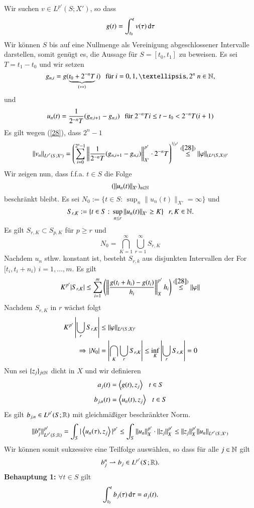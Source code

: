 \item %
Wir suchen $v\in L^{p'}(S;X')$, so dass
\[
    g(t)=\int_{t_0}^t v(\tau) \, \mathrm{d} \tau
\]
Wir können $S$ bis auf eine Nullmenge als Vereinigung abgeschlossener Intervalle darstellen, somit genügt
es, die Aussage für $S=[t_0,t_1]$ zu beweisen. Es sei $T=t_1-t_0$ und wir setzen
\[
    g_{n,i} = g(\underbrace{t_0+2^{-n}T}_{(**)}i) \qq\text{für $i=0,1,…,2^n$ $n\in\N$},
\]
und
\[
    u_n(t)=\frac1{2^{-n}T} (g_{n,i+1}-g_{n,i})\hspace{.25cm} \text{für $2^{-n}Ti\leq t-t_0<2^{-n}T(i+1)$}
\]
Es gilt wegen (\ref{28}), dass $2^n-1$
\begin{align}\label{29}
    \|v_n\|_{L^{p'}(S;X')} = \left( \sum_{i=0}^{2^n-1}\left\| \frac1{2^{-n}T}(g_{n,i+1}-g_{n,i}) \right\|
    ^{p'}_{X'}\cdot 2^{-n}T\right)^{\nicefrac1{p'}} \overset{(\ref{28})}{\leq} \|\varphi\|_{(L^p(S,X))'}
\end{align}
Wir zeigen nun, dass f.f.a. $t\in S$ die Folge
\[
    (\|u_n(t)\|_{X'})_{n\in\mathbb{N}}
\]
beschränkt bleibt. Es sei $N_0:=\{t\in S: \, \sup_{n}\|u_n(t)\|_{X'}=\infty \}$ und
\[
    S_{r,K}:= \{t\in S: \, \sup_{n\leq r} \|u_n(t)\|_{X'}\geq K\} \hspace{.25cm} r,K\in \mathbb{N}.
\]
Es gilt $S_{r,K}\subset S_{p,K}$ für $p\geq r$ und
\[
    N_0 = \bigcap_{K=1}^\infty \bigcup_{r=1}^\infty S_{r,K}
\]
Nachdem $u_n$ sthw. konstant ist, besteht $S_{r,k}$ aus disjunkten Intervallen der For $[t_i,t_i+n_i)$ 
$i=1, … , m$. Es gilt
\[
    K^{p'}|S_{r,K}|\leq \sum_{i=1}^m \left( \left\| \frac{g(t_i+h_i)-g(t_i)}{h_i}\right\|^{p'}_{X} h_i
            \right) \overset{(\ref{28})}{\leq} \|\varphi\|
\]
Nachdem $S_{r,K}$ in $r$ wächst folgt
\begin{align*}
    K^{p'} \left|\bigcup_rS_{r,K}\right| &\leq \|\varphi\|_{L^p(S;X)'}\\
    \Rightarrow \, |N_0|&=\left| \bigcap_K\bigcup_r S_{r,K} \right| \leq \inf_{K}\left|\bigcup _r S_{r,K} \right|
    =0
\end{align*}
Nun sei $\{z_j\}_{j\in\mathbb{N}}$ dicht in $X$ und wir definieren
\[
    a_j(t)=\left\langle g(t), z_j\right\rangle \hspace{.25cm} t\in S
\]
\[
    b_{j,u}(t) =\left\langle u_n(t), z_j \right\rangle \hspace{.25cm} t\in S 
\]
Es gilt $b_{j,n}\in L^{p'}(S;\mathbb{R})$ mit gleichmäßiger beschränkter Norm.
\[
    \|b_j^n\|_{L^{p'}(S;\mathbb{R})}^{p'}=\int_S|\left\langle u_n(\tau), z_j\right\rangle|^{p'}\leq \int_S \|u_n\|_X^{p'} \cdot
    \|z_j\|_X^{p'} \leq \|z_j\|_X^{p'} \|u_n\|_{L^{p'}(S;X')}
\]
Wir können somit sukzessive eine Teilfolge auswählen, so dass für alle $j\in \mathbb{N}$ gilt
\[
    b_j^n\rightharpoonup b_j \in L^{p'}(S;\mathbb{R}).
\]
\textbf{Behauptung 1:} $\forall t\in S$ gilt
\[
    \int_{t_0}^t b_j(\tau) \, \mathrm{d} \tau= a_j (t).
\]
